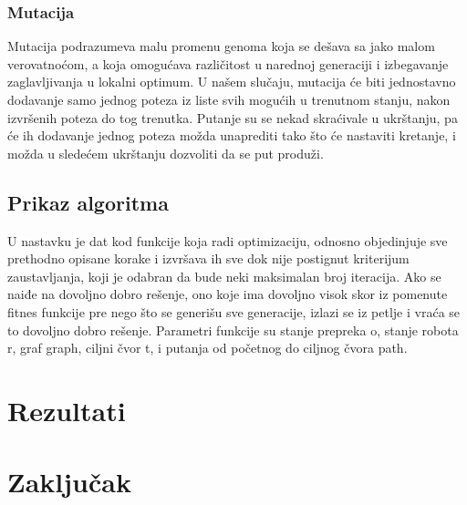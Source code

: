 \documentclass[12pt]{article}
\begin{document}
	
	\subsubsection{Mutacija}
	\label{subsec:podnaslov3}
	Mutacija podrazumeva malu promenu genoma koja se dešava sa jako malom verovatnoćom, a koja omogućava različitost u narednoj generaciji i izbegavanje zaglavljivanja u lokalni optimum. U našem slučaju, mutacija će biti jednostavno dodavanje samo jednog poteza iz liste svih mogućih u trenutnom stanju, nakon izvršenih poteza do tog trenutka. Putanje su se nekad skraćivale u ukrštanju, pa će ih dodavanje jednog poteza možda unaprediti tako što će nastaviti kretanje, i možda u sledećem ukrštanju dozvoliti da se put produži.
	\vspace*{1\baselineskip}
	
	


	\subsection{Prikaz algoritma}
	\label{sec:cetvrtoPoglavlje}
	U nastavku je dat kod funkcije koja radi optimizaciju, odnosno objedinjuje sve prethodno opisane korake i izvršava ih sve dok nije postignut kriterijum zaustavljanja, koji je odabran da bude neki maksimalan broj iteracija. Ako se naiđe na dovoljno dobro rešenje, ono koje ima dovoljno visok skor iz pomenute fitnes funkcije pre nego što se generišu sve generacije, izlazi se iz petlje i vraća se to dovoljno dobro rešenje. Parametri funkcije su stanje prepreka o, stanje robota r, graf graph, ciljni čvor t, i putanja od početnog do ciljnog čvora path.
	\vspace*{1\baselineskip}
	
	
	\vspace*{3\baselineskip}
	\section{Rezultati}

	
	\vspace*{3\baselineskip}
	\section{Zaključak}
	\label{sec:zakljucak}

	\newpage
	 
	
	
\end{document}
